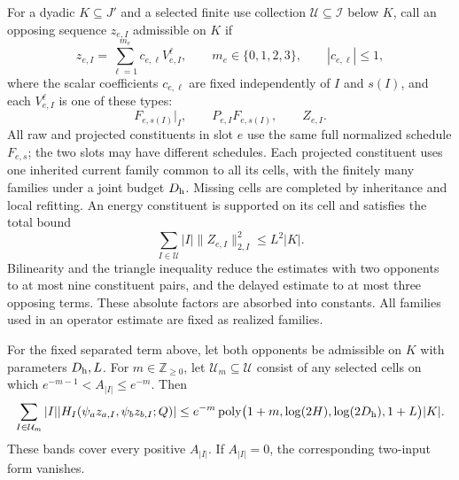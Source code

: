 For a dyadic \(K\subseteq J'\) and a selected finite use collection
\(\mathcal U\subseteq\mathcal I\) below \(K\), call an opposing
sequence \(z_{e,I}\) admissible on \(K\) if
\[
 z_{e,I}=\sum_{\ell=1}^{m_e}c_{e,\ell}V_{e,I}^{\ell},\qquad
 m_e\in\{0,1,2,3\},\qquad |c_{e,\ell}|\le1,
\]
where the scalar coefficients \(c_{e,\ell}\) are fixed independently
of \(I\) and \(s(I)\), and each \(V_{e,I}^{\ell}\) is one of these types:
\[
 F_{e,s(I)}|_I,\qquad P_{e,I}F_{e,s(I)},\qquad Z_{e,I}.
\]
All raw and projected constituents in slot \(e\) use the same full
normalized schedule \(F_{e,s}\); the two slots may have different
schedules.  Each projected constituent uses one inherited current
family common to all its cells, with the finitely many families under
a joint budget \(D_{\rm h}\).  Missing cells are completed by
inheritance and local refitting.  An energy constituent is supported
on its cell and satisfies the total bound
\[
 \sum_{I\in\mathcal U}|I|\|Z_{e,I}\|_{2,I}^2\le L^2|K|.
\]
Bilinearity and the triangle inequality reduce the estimates with two
opponents to at most nine constituent pairs, and the delayed estimate
to at most three opposing terms.  These absolute factors are absorbed
into constants.  All families used in an operator estimate are fixed
as realized families.

\begin{lemma}
\label{lem:hbase-scale}
For the fixed separated term above, let both opponents be admissible
on \(K\) with parameters \(D_{\rm h},L\).  For
\(m\in\mathbb Z_{\ge0}\), let \(\mathcal U_m\subseteq\mathcal U\)
consist of any selected cells on which
\(e^{-m-1}<A_{|I|}\le e^{-m}\).  Then
\begin{equation}
 \sum_{I\in\mathcal U_m}|I|
   |H_I(\psi_a z_{a,I},\psi_b z_{b,I};Q)|
 \le e^{-m}\operatorname{poly}
       \bigl(1+m,\log(2H),\log(2D_{\rm h}),1+L\bigr)|K|.       \label{eq:hbase-scale-sum}
\end{equation}
These bands cover every positive \(A_{|I|}\).  If \(A_{|I|}=0\),
the corresponding two-input form vanishes.
\end{lemma}

